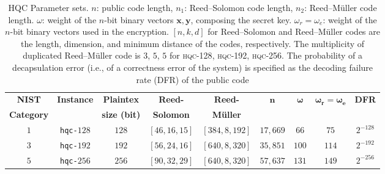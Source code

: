 \begin{table}[!t]
    \centering
    \caption{HQC Parameter sets. $n$: public code length, $n_1$: Reed–Solomon code length, $n_2$: Reed–M\"{u}ller code length. $\omega$: weight of the $n$-bit binary vectors $\mathbf{x}, \mathbf{y}$, composing the secret key. 
    $\omega_r=\omega_e$: weight of the $n$-bit binary vectors used in the 
    encryption. $[n, k, d]$ for Reed–Solomon and Reed–M\"{u}ller codes are the 
    length, dimension, and minimum distance of the codes, respectively.
    The multiplicity of duplicated Reed–M\"{u}ller code is $3$, $5$, $5$ for \textsc{hqc-128}, \textsc{hqc-192}, \textsc{hqc-256}.
    The probability of a decapsulation error (i.e., of a correctness error of the system) is specified as the decoding failure rate (DFR) of the public code}
    {\small
     \begin{tabular}{cc|cccc|cc|c}
        \toprule
        \textbf{NIST} & \multirow{2}{*}{\textbf{Instance}} & \textbf{Plaintex} & \multirow{1}{*}{\bf 
        Reed-} & \multirow{1}{*}{\bf Reed-} & \multirow{2}{*}{$\mathbf{n}$} & \multirow{2}{*}{$\mathbf{\omega}$} & \multirow{2}{*}{$\mathbf{\omega_r = \omega_e}$} & \multirow{2}{*}{\textbf{DFR}}\\
        \textbf{Category} &  & \textbf{size (bit)} & {\bf Solomon} & {\bf M\"{u}ller}&  &  &  & \\
        \midrule
        $1$& \texttt{hqc-$128$} & $128$ &$[46, 16, 15]$ &  $[384, 8, 192]$ & $17,669$ & $66 $ & $ 75$ & $2^{-128}$\\
        $3$& \texttt{hqc-$192$} & $192$ &$[56, 24, 16]$ &  $[640, 8, 320]$ & $35,851$ & $100$ & $114$ & $2^{-192}$\\
        $5$& \texttt{hqc-$256$} & $256$ &$[90, 32, 29]$ &  $[640, 8, 320]$ & $57,637$ & $131$ & $149$ & $2^{-256}$\\
        \bottomrule
    \end{tabular}
    \label{tab:params}
    }\vspace{-0.4cm}
\end{table}
